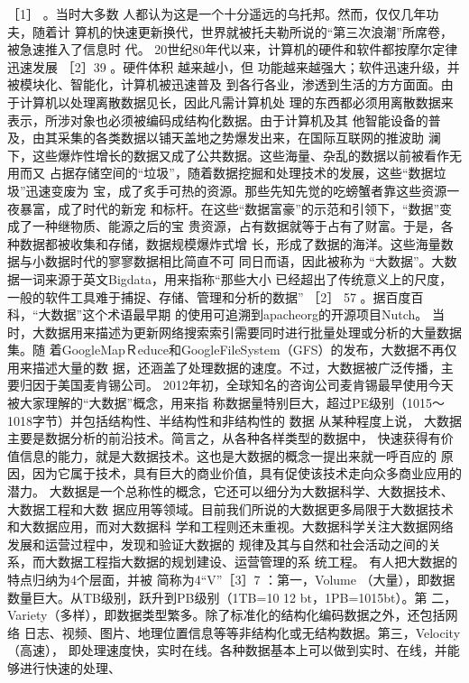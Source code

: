 \documentclass[11pt]{ctexart}
\begin{document}
{{{{［1］ 。当时大多数 人都认为这是一个十分遥远的乌托邦。然而，仅仅几年功夫，随着计
算机的快速更新换代，世界就被托夫勒所说的“第三次浪潮”所席卷，被急速推入了信息时
代。 20世纪80年代以来，计算机的硬件和软件都按摩尔定律迅速发展 ［2］39 。硬件体积
越来越小，但 功能越来越强大；软件迅速升级，并被模块化、智能化，计算机被迅速普及
到各行各业，渗透到生活的方方面面。由于计算机以处理离散数据见长，因此凡需计算机处
理的东西都必须用离散数据来表示，所涉对象也必须被编码成结构化数据。由于计算机及其
他智能设备的普及，由其采集的各类数据以铺天盖地之势爆发出来，在国际互联网的推波助
澜下，这些爆炸性增长的数据又成了公共数据。这些海量、杂乱的数据以前被看作无用而又
占据存储空间的“垃圾”，随着数据挖掘和处理技术的发展，这些“数据垃圾”迅速变废为
宝，成了炙手可热的资源。那些先知先觉的吃螃蟹者靠这些资源一夜暴富，成了时代的新宠
和标杆。在这些“数据富豪”的示范和引领下，“数据”变成了一种继物质、能源之后的宝
贵资源，占有数据就等于占有了财富。于是，各种数据都被收集和存储，数据规模爆炸式增
长，形成了数据的海洋。这些海量数据与小数据时代的寥寥数据相比简直不可
同日而语，因此被称为 “大数据”。大数据一词来源于英文Bigdata，用来指称“那些大小
已经超出了传统意义上的尺度，一般的软件工具难于捕捉、存储、管理和分析的数据” ［2］
57 。据百度百科，“大数据”这个术语最早期 的使用可追溯到apacheorg的开源项目Nutch。
当时，大数据用来描述为更新网络搜索索引需要同时进行批量处理或分析的大量数据集。随
着GoogleMapＲeduce和GoogleFileSystem（GFS）的发布，大数据不再仅用来描述大量的数
据，还涵盖了处理数据的速度。不过，大数据被广泛传播，主要归因于美国麦肯锡公司。
2012年初，全球知名的咨询公司麦肯锡最早使用今天被大家理解的“大数据”概念，用来指
称数据量特别巨大，超过PE级别（1015～1018字节）并包括结构性、半结构性和非结构性的
数据
从某种程度上说， 大数据主要是数据分析的前沿技术。简言之，从各种各样类型的数据中，
快速获得有价值信息的能力，就是大数据技术。这也是大数据的概念一提出来就一呼百应的
原因，因为它属于技术，具有巨大的商业价值，具有促使该技术走向众多商业应用的潜力。
大数据是一个总称性的概念，它还可以细分为大数据科学、大数据技术、大数据工程和大数
据应用等领域。目前我们所说的大数据更多局限于大数据技术和大数据应用，而对大数据科
学和工程则还未重视。大数据科学关注大数据网络发展和运营过程中，发现和验证大数据的
规律及其与自然和社会活动之间的关系，而大数据工程指大数据的规划建设、运营管理的系
统工程。 有人把大数据的特点归纳为4个层面，并被 简称为4“V”［3］7 ：第一，Volume
（大量），即数据数量巨大。从TB级别，跃升到PB级别（1TB=10 12 bt，1PB=1015bt）。第
二，Variety（多样），即数据类型繁多。除了标准化的结构化编码数据之外，还包括网络
日志、视频、图片、地理位置信息等等非结构化或无结构数据。第三，Velocity（高速），
即处理速度快，实时在线。各种数据基本上可以做到实时、在线，并能够进行快速的处理、
}}}}
\end{document}
